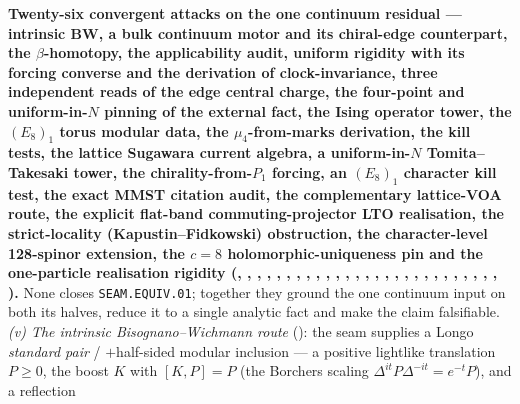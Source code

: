 \par\smallskip\noindent\textbf{Twenty-six convergent attacks on the one continuum residual --- intrinsic BW, a
bulk continuum motor and its chiral-edge counterpart, the $\beta$-homotopy, the applicability audit, uniform
rigidity with its forcing converse and the derivation of clock-invariance, three independent reads of the edge
central charge, the four-point and uniform-in-$N$ pinning of the external fact, the Ising operator tower, the
$(E_8)_1$ torus modular data, the $\mu_4$-from-marks derivation, the kill tests, the lattice Sugawara current
algebra, a uniform-in-$N$ Tomita--Takesaki tower, the chirality-from-$P_1$ forcing, an $(E_8)_1$ character kill
test, the exact MMST citation audit, the complementary lattice-VOA route, the explicit flat-band
commuting-projector LTO realisation, the strict-locality (Kapustin--Fidkowski) obstruction, the character-level
128-spinor extension, the $c{=}8$ holomorphic-uniqueness pin and the one-particle realisation rigidity
(, , ,
, ,
, ,
, ,
, ,
, ,
, ,
, ,
, ,
, ,
, ,
, ,
, ,
).} None closes
\texttt{SEAM.EQUIV.01}; together they ground the one continuum input on both its halves, reduce it to a single
analytic fact and make the claim falsifiable.
\emph{(v) The intrinsic Bisognano--Wichmann route} (): the seam supplies a
Longo \emph{standard pair} / $+$half-sided modular inclusion --- a positive lightlike translation $P\ge0$, the
boost $K$ with $[K,P]{=}P$ (the Borchers scaling $\Delta^{it}P\Delta^{-it}{=}e^{-t}P$), and a reflection
